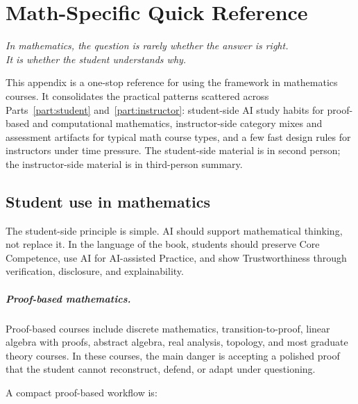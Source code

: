 \documentclass{SIAMbook2023}
\newcommand{\bookepigraph}[1]{%
  \begin{center}%
    \begin{minipage}{0.78\textwidth}%
      \centering\itshape #1%
    \end{minipage}%
  \end{center}%
  \vspace{0.6em}%
}
\begin{document}
\newpage


\chapter{Math-Specific Quick Reference}
\label{app:ch:math-specific-quick-reference}%
\label{app:math-qr}

\bookepigraph{In mathematics, the question is rarely whether the answer is right.\\It is whether the student understands why.}

This appendix is a one-stop reference for using the framework in mathematics courses. It consolidates the practical patterns scattered across Parts~\ref{part:student} and~\ref{part:instructor}: student-side AI study habits for proof-based and computational mathematics, instructor-side category mixes and assessment artifacts for typical math course types, and a few fast design rules for instructors under time pressure. The student-side material is in second person; the instructor-side material is in third-person summary.

\section{Student use in mathematics}
\label{app:math-student-use}%

The student-side principle is simple. AI should support mathematical thinking, not replace it. In the language of the book, students should preserve Core Competence, use AI for AI-assisted Practice, and show Trustworthiness through verification, disclosure, and explainability.

\paragraph{Proof-based mathematics.}
Proof-based courses include discrete mathematics, transition-to-proof, linear algebra with proofs, abstract algebra, real analysis, topology, and most graduate theory courses. In these courses, the main danger is accepting a polished proof that the student cannot reconstruct, defend, or adapt under questioning.

A compact proof-based workflow is:
\end{document}

